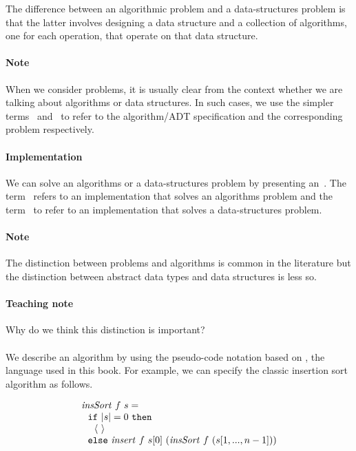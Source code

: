 The difference between an algorithmic problem and a data-structures
problem is that the latter involves designing a data structure and a
collection of algorithms, one for each operation, that operate on that
data structure.

\paragraph{Note}
When we consider problems, it is usually clear from the context
whether we are talking about algorithms or data structures.
%
In such cases, we use the simpler terms~
and~ to refer to the algorithm/ADT specification and the
corresponding problem respectively.

\paragraph{Implementation}
We can solve an algorithms or a data-structures problem by presenting
an~.  
%
The term~ refers to an implementation that solves an
algorithms problem and the term~ to
refer to an implementation that solves a data-structures problem.

\paragraph{Note}
The distinction between problems and algorithms is common in the
literature but the distinction between abstract data types and data
structures is less so.

\paragraph{Teaching note}
Why do we think this distinction is important?

\paragraph{}
We describe an algorithm by using the pseudo-code notation based on
\pml, the language  used in this book.  For example, we can specify
the classic insertion sort algorithm as follows.
%

\[
\begin{array}{l}
\mathit{insSort}~f~s =
\\ 
~~\texttt{if}~|s| = 0~\texttt{then} 
\\
~~~~\left\langle\,  \,\right\rangle
\\
~~\texttt{else}~\mathit{insert}~f~s[0]~(\mathit{insSort}~f~(s[1,...,n-1]))
\end{array}
\]


